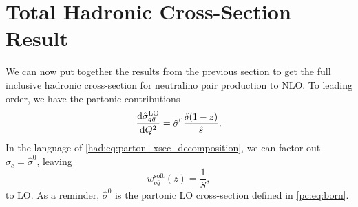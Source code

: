 \documentclass[../main.tex]{subfiles}
\begin{document}
\section{Total Hadronic Cross-Section Result}
\label{had:sec:total_cross_section}
We can now put together the results from the previous section to get the full inclusive hadronic cross-section for neutralino pair production to NLO\@.
To leading order, we have the partonic contributions
\begin{equation}
  \d[Q^2]{\hat\sigma^\text{LO}_{q\bar{q}}} = \hat\sigma^0 \frac{\delta(1-z)}{\hat{s}}.
\end{equation}
In the language of \cref{had:eq:parton_xsec_decomposition}, we can factor out \(\hat\sigma_c = \hat\sigma^0\), leaving
\begin{equation}
  w_{q\bar{q}}^\text{soft}(z) = \frac{1}{S},
\end{equation}
to LO\@.
As a reminder, \(\hat\sigma^0\) is the partonic LO cross-section defined in \cref{pc:eq:born}.
\end{document}

